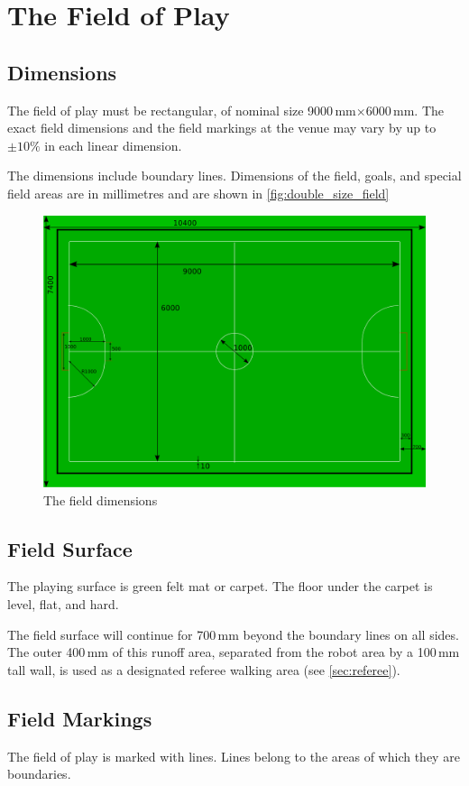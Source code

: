 \section{The Field of Play}\label{sec:field-of-play}

\subsection{Dimensions}
The field of play must be rectangular,
of nominal size 9000\,mm$\times$6000\,mm.
The exact field dimensions and the field markings at the venue may vary by up
to $\pm10\%$ in each linear dimension.

The dimensions include boundary lines.
Dimensions of the field, goals, and special field areas are in millimetres and
are shown in \autoref{fig:double_size_field}

\begin{figure}[ht] %
  \centering
  \includegraphics[width=0.8\columnwidth]{img/double-size-field.png}
  \caption{The field dimensions}
  \label{fig:double_size_field}
\end{figure}


\subsection{Field Surface}
The playing surface is green felt mat or carpet.
The floor under the carpet is level, flat, and hard.

The field surface will continue for 700\,mm beyond
the boundary lines on all sides.
The outer 400\,mm of this runoff area, separated from the robot area by a
100\,mm tall wall, is used as a designated referee walking area (see
\autoref{sec:referee}).

\subsection{Field Markings}
The field of play is marked with lines.
Lines belong to the areas of which they are boundaries.

